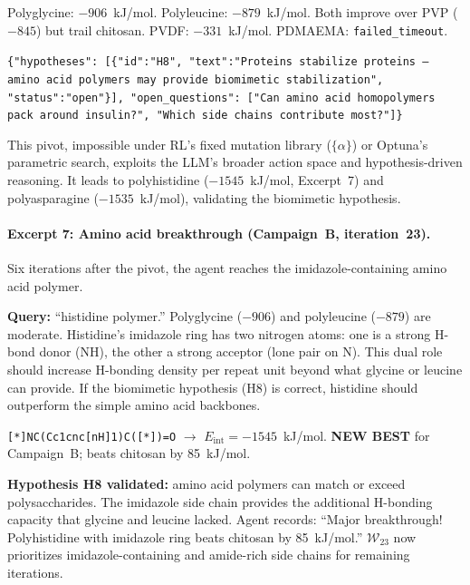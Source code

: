\documentclass[twocolumn]{fairmeta}
\begin{document}
\begin{toolcall}
\scriptsize
Polyglycine: $-906$~kJ/mol. Polyleucine: $-879$~kJ/mol.
Both improve over PVP ($-845$) but trail chitosan.
PVDF: $-331$~kJ/mol. PDMAEMA: \texttt{failed\_timeout}.
\end{toolcall}

\begin{toolcall}
\scriptsize
\texttt{\{"hypotheses": [\{"id":"H8", "text":"Proteins stabilize proteins -- amino acid polymers may provide biomimetic stabilization", "status":"open"\}], "open\_questions": ["Can amino acid homopolymers pack around insulin?", "Which side chains contribute most?"]\}}
\end{toolcall}

\noindent This pivot, impossible under RL's fixed mutation library ($\{\alpha\}$) or Optuna's parametric search, exploits the LLM's broader action space and hypothesis-driven reasoning.
It leads to polyhistidine ($-1545$~kJ/mol, Excerpt~7) and polyasparagine ($-1535$~kJ/mol), validating the biomimetic hypothesis.

\paragraph{Excerpt 7: Amino acid breakthrough (Campaign~B, iteration~23).}
Six iterations after the pivot, the agent reaches the imidazole-containing amino acid polymer.

\begin{agentthought}
\scriptsize
\textbf{Query:} ``histidine polymer.''
Polyglycine ($-906$) and polyleucine ($-879$) are moderate.
Histidine's imidazole ring has two nitrogen atoms: one is a strong H-bond donor (NH), the other a strong acceptor (lone pair on N).
This dual role should increase H-bonding density per repeat unit beyond what glycine or leucine can provide.
If the biomimetic hypothesis (H8) is correct, histidine should outperform the simple amino acid backbones.
\end{agentthought}

\begin{toolcall}
\scriptsize
\texttt{[*]NC(Cc1cnc[nH]1)C([*])=O} $\to$ $E_\text{int} = -1545$~kJ/mol.
\textbf{NEW BEST} for Campaign~B; beats chitosan by 85~kJ/mol.
\end{toolcall}

\begin{observation}
\scriptsize
\textbf{Hypothesis H8 validated:} amino acid polymers can match or exceed polysaccharides.
The imidazole side chain provides the additional H-bonding capacity that glycine and leucine lacked.
Agent records: ``Major breakthrough! Polyhistidine with imidazole ring beats chitosan by 85~kJ/mol.''
$\mathcal{W}_{23}$ now prioritizes imidazole-containing and amide-rich side chains for remaining iterations.
\end{observation}
\end{document}
